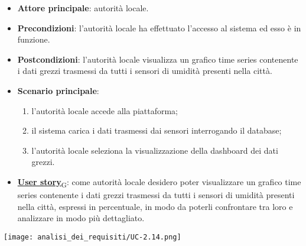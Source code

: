 \begin{itemize}
	\item \textbf{Attore principale}: autorità locale.
	\item \textbf{Precondizioni}: l'autorità locale ha effettuato l'accesso al sistema ed esso è in funzione.
	\item \textbf{Postcondizioni}: l'autorità locale visualizza un grafico time series contenente i dati grezzi trasmessi da tutti i sensori
	      di umidità presenti nella città.
	\item \textbf{Scenario principale}:
	      \begin{enumerate}
		      \item l'autorità locale accede alla piattaforma;
		      \item il sistema carica i dati trasmessi dai sensori interrogando il database;
		      \item l'autorità locale seleziona la visualizzazione della dashboard dei dati grezzi.
	      \end{enumerate}
	\item \href{https://7last.github.io/docs/rtb/documentazione-interna/glossario\#user-story}{\textbf{User story}\textsubscript{G}}:
	      come autorità locale desidero poter visualizzare un grafico time series contenente i dati grezzi trasmessi da tutti i sensori
	      di umidità presenti nella città, espressi in percentuale, in modo da poterli confrontare tra loro e analizzare in modo più dettagliato.
\end{itemize}
\begin{center}
	\texttt{[image: analisi\_dei\_requisiti/UC-2.14.png]}
\end{center}


